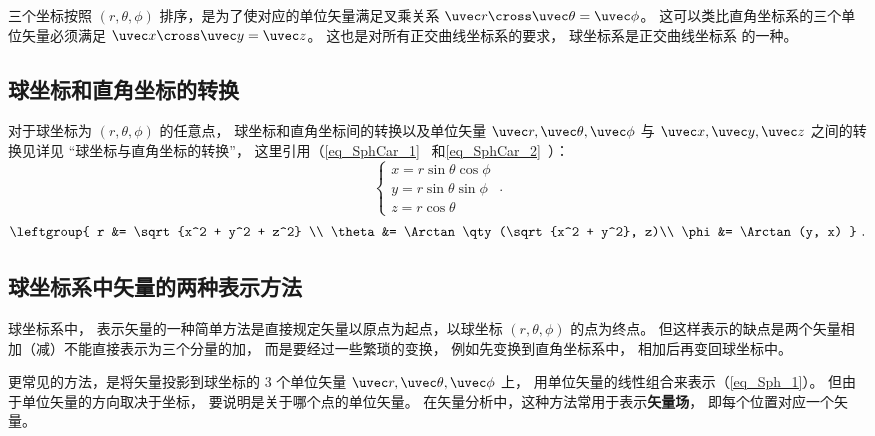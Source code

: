 三个坐标按照 $(r, \theta , \phi )$ 排序，是为了使对应的单位矢量满足叉乘关系 $\uvec r \cross \uvec \theta  = \uvec \phi $。 这可以类比直角坐标系的三个单位矢量必须满足 $\uvec x \cross \uvec y = \uvec z$。 这也是对所有正交曲线坐标系的要求， 球坐标系是正交曲线坐标系 的一种。

\subsection{球坐标和直角坐标的转换}
对于球坐标为 $(r, \theta , \phi )$ 的任意点， 球坐标和直角坐标间的转换以及单位矢量 $\uvec r, \uvec \theta, \uvec \phi$  与 $\uvec x, \uvec y, \uvec z$ 之间的转换见详见 “球坐标与直角坐标的转换”， 这里引用（\autoref{eq_SphCar_1}~ 和\autoref{eq_SphCar_2}~）：
\begin{equation}
\begin{cases}
x = r\sin \theta \cos \phi \\
y = r\sin \theta \sin \phi \\
z = r\cos \theta 
\end{cases}~.
\end{equation}
\begin{equation}
\leftgroup{
r &= \sqrt {x^2 + y^2 + z^2} \\
\theta  &= \Arctan\qty(\sqrt{x^2 + y^2}, z)\\
\phi  &= \Arctan(y, x)
}~.\end{equation}


 
\subsection{球坐标系中矢量的两种表示方法}
球坐标系中， 表示矢量的一种简单方法是直接规定矢量以原点为起点，以球坐标 $(r, \theta, \phi)$ 的点为终点。 但这样表示的缺点是两个矢量相加（减）不能直接表示为三个分量的加， 而是要经过一些繁琐的变换， 例如先变换到直角坐标系中， 相加后再变回球坐标中。

更常见的方法，是将矢量投影到球坐标的 3 个单位矢量 $\uvec r, \uvec \theta, \uvec \phi$ 上， 用单位矢量的线性组合来表示（\autoref{eq_Sph_1}）。 但由于单位矢量的方向取决于坐标， 要说明是关于哪个点的单位矢量。 在矢量分析中，这种方法常用于表示\textbf{矢量场}， 即每个位置对应一个矢量。

